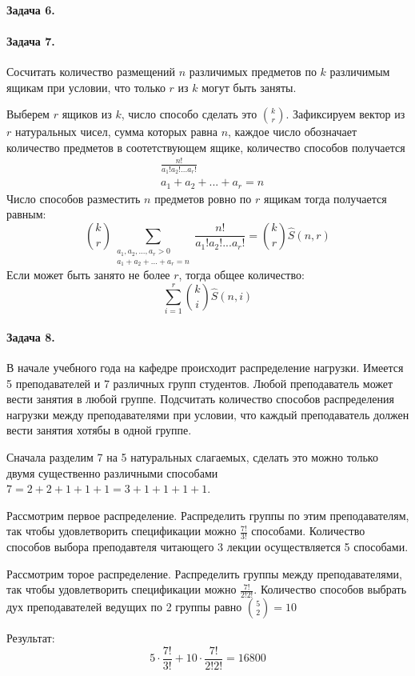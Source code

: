 \documentclass[a4paper,12pt]{article}
\begin{document}
\paragraph{Задача 6.}

\paragraph{Задача 7.} Сосчитать количество размещений $n$ различимых предметов по $k$ различимым ящикам при условии, что только $r$ из $k$ могут быть заняты.

\begin{Solution}
Выберем $r$ ящиков из $k$, число способо сделать это $\binom{k}{r}$. Зафиксируем вектор из $r$ натуральных чисел, сумма которых равна $n$, каждое число обозначает количество предметов в соотетствующем ящике, количество способов получается
\[
	\begin{split}
		& \frac{n!}{a_1!a_2!...a_r!} \\
		& a_1+a_2+...+a_r=n
	\end{split}
\]
Число способов разместить $n$ предметов ровно по $r$ ящикам тогда получается равным:
\[
	\binom{k}{r}\sum_{\substack{a_1,a_2,...,a_r>0 \\ a_1+a_2+...+a_r=n}} \frac{n!}{a_1!a_2!...a_r!} = \binom{k}{r} \hat S \left(n,r\right)
\]
Если может быть занято не более $r$, тогда общее количество:
\[
	\sum_{i=1}^{r} \binom{k}{i} \hat S \left(n,i\right)
\]
\end{Solution}

\paragraph{Задача 8.} В начале учебного года на кафедре происходит распределение нагрузки. Имеется 5 преподавателей и 7 различных групп студентов. Любой преподаватель может вести занятия в любой группе. Подсчитать количество способов распределения нагрузки между преподавателями при условии, что каждый преподаватель должен вести занятия хотябы в одной группе.

\begin{Solution}
Сначала разделим 7 на 5 натуральных слагаемых, сделать это можно только двумя существенно различными способами $7=2+2+1+1+1=3+1+1+1+1$.

Рассмотрим первое распределение. Распределить группы по этим преподавателям, так чтобы удовлетворить спецификации можно $\frac{7!}{3!}$ способами. Количество способов выбора преподавтеля читающего 3 лекции осуществляется 5 способами.

Рассмотрим торое распределение. Распределить группы между преподавателями, так чтобы удовлетворить спецификации можно $\frac{7!}{2!2!}$. Количество способов выбрать дух преподавателей ведущих по 2 группы равно $\binom{5}{2} = 10$

Результат:
\[
	5 \cdot \frac{7!}{3!} + 10 \cdot \frac{7!}{2!2!} = 16800
\] 
\end{Solution}
\end{document}
